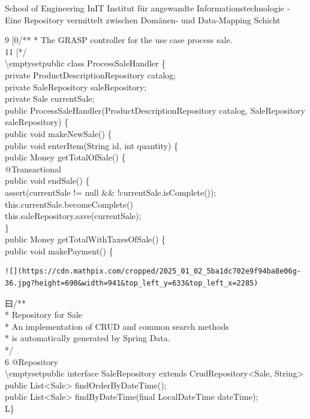 School of Engineering
InIT Institut für angewandte Informationstechnologie
- Eine Repository vermittelt zwischen Domänen- und Data-Mapping Schicht


9 [0/** * The GRASP controller for the use case process sale.\\
11 [*/\\
\textbackslash emptysetpublic class ProcessSaleHandler \{\\
private ProductDescriptionRepository catalog;\\
private SaleRepository saleRepository;\\
private Sale currentSale;\\
public ProcessSaleHandler(ProductDescriptionRepository catalog, SaleRepository saleRepository) \{\\
public void makeNewSale() \{\\
public void enterItem(String id, int quantity) \{\\
public Money getTotalOfSale() \{\\
@Transactional\\
public void endSale() \{\\
assert(currentSale != null \&\& !currentSale.isComplete());\\
this.currentSale.becomeComplete()\\
this.saleRepository.save(currentSale);\\
\}\\
public Money getTotalWithTaxesOfSale() \{\\
public void makePayment() \{

\begin{verbatim}
![](https://cdn.mathpix.com/cropped/2025_01_02_5ba1dc702e9f94ba8e06g-36.jpg?height=690&width=941&top_left_y=633&top_left_x=2285)
\end{verbatim}

曰/**\\
* Repository for Sale\\
* An implementation of CRUD and common search methods\\
* is automatically generated by Spring Data.\\
*/\\
6 @Repository\\
\textbackslash emptysetpublic interface SaleRepository extends CrudRepository<Sale, String>\\
public List<Sale> findOrderByDateTime();\\
public List<Sale> findByDateTime(final LocalDateTime dateTime);\\
L\}

